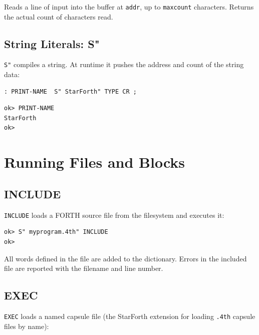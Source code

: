 Reads a line of input into the buffer at \texttt{addr}, up to
\texttt{maxcount} characters. Returns the actual count of characters read.

\section{String Literals: S"}
\label{sec:s-quote}

\texttt{S"} compiles a string. At runtime it pushes the address and count of
the string data:

\begin{lstlisting}[language=Forth]
: PRINT-NAME  S" StarForth" TYPE CR ;
\end{lstlisting}

\begin{lstlisting}[language=Forth]
ok> PRINT-NAME
StarForth
ok>
\end{lstlisting}

\chapter{Running Files and Blocks}
\label{chap:files}

\section{INCLUDE}
\label{sec:include}

\texttt{INCLUDE} loads a FORTH source file from the filesystem and executes
it:

\begin{lstlisting}[language=Forth]
ok> S" myprogram.4th" INCLUDE
ok>
\end{lstlisting}

All words defined in the file are added to the dictionary. Errors in the
included file are reported with the filename and line number.

\section{EXEC}
\label{sec:exec}

\texttt{EXEC} loads a named capsule file (the StarForth extension for loading
\texttt{.4th} capsule files by name):

